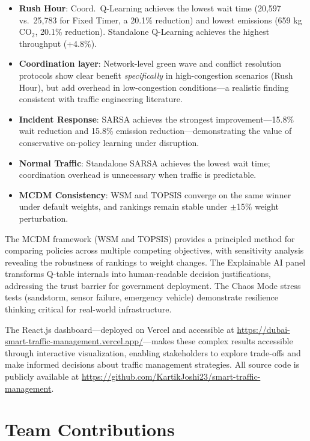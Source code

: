 \documentclass[12pt, a4paper]{article}
\begin{document}
\begin{itemize}[nosep]
    \item \textbf{Rush Hour}: Coord.\ Q-Learning achieves the lowest wait time (20,597 vs.\ 25,783 for Fixed Timer, a 20.1\% reduction) and lowest emissions (659 kg CO$_2$, 20.1\% reduction). Standalone Q-Learning achieves the highest throughput (+4.8\%).
    \item \textbf{Coordination layer}: Network-level green wave and conflict resolution protocols show clear benefit \emph{specifically} in high-congestion scenarios (Rush Hour), but add overhead in low-congestion conditions---a realistic finding consistent with traffic engineering literature.
    \item \textbf{Incident Response}: SARSA achieves the strongest improvement---15.8\% wait reduction and 15.8\% emission reduction---demonstrating the value of conservative on-policy learning under disruption.
    \item \textbf{Normal Traffic}: Standalone SARSA achieves the lowest wait time; coordination overhead is unnecessary when traffic is predictable.
    \item \textbf{MCDM Consistency}: WSM and TOPSIS converge on the same winner under default weights, and rankings remain stable under $\pm$15\% weight perturbation.
\end{itemize}

The MCDM framework (WSM and TOPSIS) provides a principled method for comparing policies across multiple competing objectives, with sensitivity analysis revealing the robustness of rankings to weight changes. The Explainable AI panel transforms Q-table internals into human-readable decision justifications, addressing the trust barrier for government deployment. The Chaos Mode stress tests (sandstorm, sensor failure, emergency vehicle) demonstrate resilience thinking critical for real-world infrastructure.

The React.js dashboard---deployed on Vercel and accessible at \url{https://dubai-smart-traffic-management.vercel.app/}---makes these complex results accessible through interactive visualization, enabling stakeholders to explore trade-offs and make informed decisions about traffic management strategies. All source code is publicly available at \url{https://github.com/KartikJoshi23/smart-traffic-management}.

\section{Team Contributions}
\end{document}
